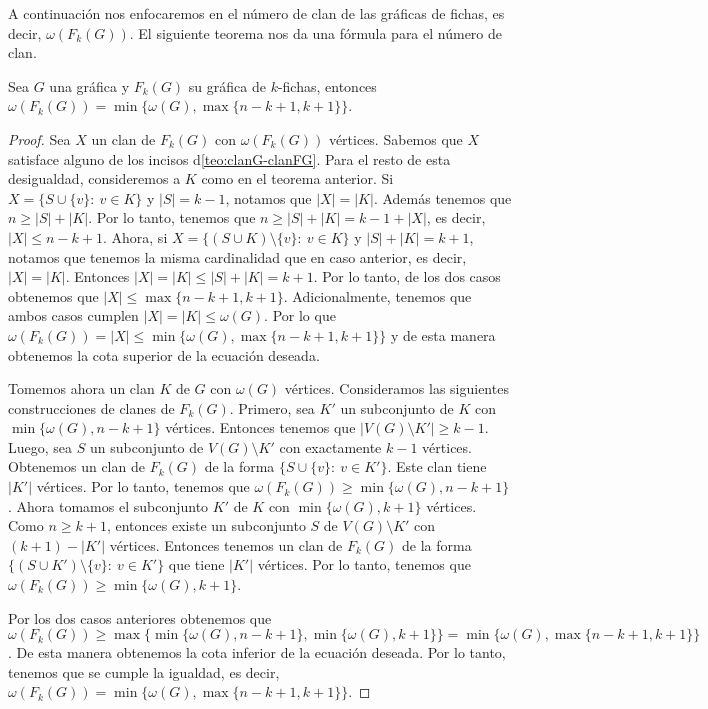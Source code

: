 A continuaci\'on nos enfocaremos en el n\'umero de clan de las gr\'aficas de
fichas, es decir, $\omega(F_k(G))$. El siguiente teorema nos da una f\'ormula
para el n\'umero de clan.
            
\begin{teorema}
\label{teo:clan-max}
    Sea $G$ una gr\'afica y $F_k(G)$ su gr\'afica de $k$-fichas, entonces
    $\omega(F_k(G))= \min \{\omega(G), \max \{n-k+1,k+1\}\}$.
\end{teorema}

\begin{proof}
    Sea $X$ un clan de $F_k(G)$ con $\omega(F_k(G))$ v\'ertices. Sabemos que $X$
    satisface alguno de los incisos d\cref{teo:clanG-clanFG}. Para el resto de
    esta desigualdad, consideremos a $K$ como en el teorema anterior.   Si $X =
    \{S \cup \{v\} \colon\ v \in K\}$ y $|S| = k-1$, notamos que $|X| = |K|$.
    Adem\'as tenemos que $n \geq |S| + |K|$. Por lo tanto, tenemos que $n \geq
    |S| + |K| = k-1 + |X|$, es decir, $|X| \leq n-k+1$. Ahora, si $X = \{(S\cup
    K) \setminus \{v\} \colon\ v \in K \}$ y $|S| + |K| = k+1$, notamos que
    tenemos la misma cardinalidad que en caso anterior, es decir, $|X| =|K|$.
    Entonces $|X| = |K| \leq |S| + |K| = k+1$. Por lo tanto, de los dos casos
    obtenemos que $|X| \leq \max\{n-k+1, k+1\}$. Adicionalmente, tenemos que
    ambos casos cumplen $|X| = |K| \leq \omega(G)$. Por lo que $\omega(F_k(G)) =
    |X| \leq \min \{\omega(G), \max \{n-k+1, k+1\}\}$ y de esta manera obtenemos
    la cota superior de la ecuaci\'on deseada.

    Tomemos ahora un clan $K$ de $G$ con $\omega(G)$ v\'ertices. Consideramos
    las siguientes construcciones de clanes de $F_k(G)$. Primero, sea $K'$ un
    subconjunto de $K$ con $\min\{\omega(G),n-k+1\}$ v\'ertices. Entonces
    tenemos que $|V(G) \setminus K'| \geq k-1$. Luego, sea $S$ un subconjunto de
    $V(G) \setminus K'$ con exactamente $k-1$ v\'ertices. Obtenemos un clan de
    $F_k(G)$ de la forma $\{ S \cup \{v\} \colon\ v \in K'\}$. Este clan tiene
    $|K'|$ v\'ertices. Por lo tanto, tenemos que $\omega(F_k(G)) \geq \min
    \{\omega(G), n-k+1\}$. Ahora tomamos el subconjunto $K'$ de $K$ con $\min \{
    \omega(G), k+1\}$ v\'ertices. Como $n \geq k+1$, entonces existe un
    subconjunto $S$ de $V(G) \setminus K'$ con $(k+1)-|K'|$ v\'ertices. Entonces
    tenemos un clan de $F_k(G)$ de la forma $\{ (S \cup K') \setminus \{v\}
    \colon\ v \in K'\}$ que tiene $|K'|$ v\'ertices. Por lo tanto, tenemos que
    $\omega(F_k(G)) \geq \min \{\omega(G), k+1\}$.

    Por los dos casos anteriores obtenemos que $\omega(F_k(G)) \geq \max \{\min
    \{\omega(G), n-k+1\}, \min \{\omega(G), k+1 \}\} = \min \{\omega(G), \max
    \{n-k+1,k+1\}\}$. De esta manera obtenemos la cota inferior de la ecuaci\'on
    deseada. Por lo tanto, tenemos que se cumple la igualdad, es decir,
    $\omega(F_k(G))= \min \{\omega(G), \max \{n-k+1,k+1\}\}$.
\end{proof}

